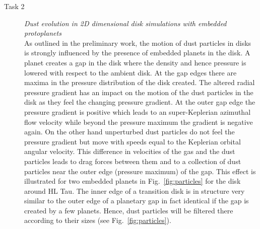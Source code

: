 \documentclass[10pt,fleqn,twoside]{article}
\begin{document}
\begin{description}
\item[Task 2]
{\it Dust evolution in 2D dimensional disk simulations with embedded protoplanets}\\
%
As outlined in the preliminary work, the motion of dust particles in disks is strongly influenced by
the presence of embedded planets in the disk. A planet creates a gap in the disk where the density and
hence pressure is lowered with respect to the ambient disk. At the gap edges there are maxima in the pressure distribution
of the disk created. The altered radial pressure gradient has an impact on the motion of the dust particles
in the disk as they feel the changing pressure gradient. At the outer gap edge the pressure gradient is positive 
which leads to an super-Keplerian azimuthal flow velocity while beyond the pressure maximum the gradient is negative again.
On the other hand unperturbed dust particles do not feel the pressure gradient but move with speeds equal to the
Keplerian orbital angular velocity. This difference in velocities of the gas and the dust particles leads to drag
forces between them and to a collection of dust particles near the outer edge (pressure maximum) of the gap.
This effect is illustrated for two embedded planets in Fig.~\ref{fig:particles} for the disk around HL Tau.
The inner edge of a transition disk is in structure very similar to the outer edge of a planetary gap in fact identical
if the gap is created by a few planets. Hence, dust particles will be filtered there according to their sizes
(see Fig.~\ref{fig:particles}).


\end{description}
\end{document}
